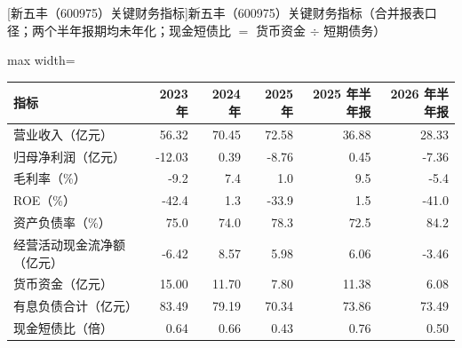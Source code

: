 \begin{center}\small\setlength{\tabcolsep}{3.4pt}
[新五丰（600975）关键财务指标]{新五丰（600975）关键财务指标（合并报表口径；两个半年报期均未年化；现金短债比 $=$ 货币资金 $\div$ 短期债务）}
\begin{adjustbox}{max width=\textwidth}
\begin{tabular}{@{}lrrrrr@{}}
\toprule
指标 & 2023 年 & 2024 年 & 2025 年 & 2025 年半年报 & 2026 年半年报 \\
\midrule
营业收入（亿元） & 56.32 & 70.45 & 72.58 & 36.88 & 28.33 \\
归母净利润（亿元） & -12.03 & 0.39 & -8.76 & 0.45 & -7.36 \\
毛利率（\%） & -9.2 & 7.4 & 1.0 & 9.5 & -5.4 \\
ROE（\%） & -42.4 & 1.3 & -33.9 & 1.5 & -41.0 \\
资产负债率（\%） & 75.0 & 74.0 & 78.3 & 72.5 & 84.2 \\
经营活动现金流净额（亿元） & -6.42 & 8.57 & 5.98 & 6.06 & -3.46 \\
货币资金（亿元） & 15.00 & 11.70 & 7.80 & 11.38 & 6.08 \\
有息负债合计（亿元） & 83.49 & 79.19 & 70.34 & 73.86 & 73.49 \\
现金短债比（倍） & 0.64 & 0.66 & 0.43 & 0.76 & 0.50 \\
\bottomrule
\end{tabular}
\end{adjustbox}
\end{center}

